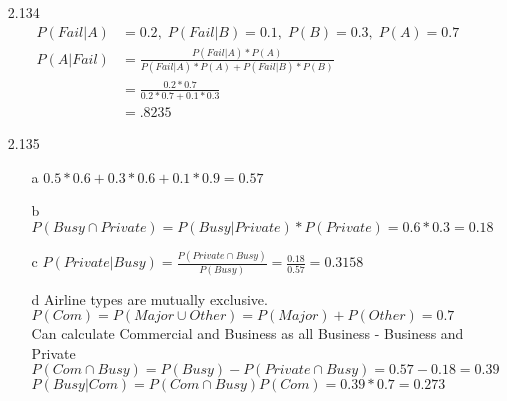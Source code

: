 \documentclass[11pt]{article}
\begin{document}
\begin{enumerate}
        \item[2.134]
        \begin{align*}
            P(Fail | A) &= 0.2,\; P(Fail | B) = 0.1,\; P(B) = 0.3,\; P(A) = 0.7 \\
            P(A | Fail) &= \frac{P(Fail | A) * P(A)}{P(Fail | A) * P(A) + P(Fail | B) * P(B)} \\
            &= \frac{0.2 * 0.7}{0.2 * 0.7 + 0.1 * 0.3} \\
            &= .8235
        \end{align*}

        \item[2.135]
        \begin{enumerate}
            $P(Major) = 0.6$, $P(Private) = 0.3$, $P(Other) = 0.1$, \\
            $P(Busy | Major) = 0.5$, $P(Busy | Private) = 0.6$, $P(Busy | Other) = 0.9$
            \item[a] $0.5*0.6 + 0.3*0.6 + 0.1 * 0.9 = 0.57$
            \item[b] $P(Busy \cap Private) = P(Busy | Private)*P(Private) = 0.6 * 0.3 = 0.18$
            \item[c] $P(Private | Busy) = \frac{P(Private \cap Busy)}{P(Busy)} = \frac{0.18}{0.57} = 0.3158$
            \item[d] Airline types are mutually exclusive. $P(Com) = P(Major \cup Other) = P(Major) + P(Other) = 0.7$\\
                    Can calculate Commercial and Business as all Business - Business and Private \\
                    $P(Com \cap Busy) = P(Busy) - P(Private \cap Busy) = 0.57 - 0.18 = 0.39$ \\
                    $P(Busy | Com) = P(Com \cap Busy)P(Com) = 0.39 * 0.7 = 0.273$
        \end{enumerate}
    \end{enumerate}
\end{document}
